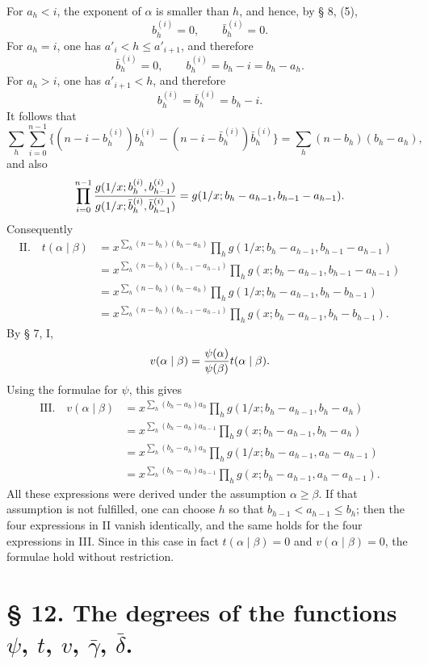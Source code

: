 \documentclass[11pt,a4paper]{article}
\begin{document}
For $a_h<i$, the exponent of $\alpha$ is smaller than $h$, and hence, by § 8, (5),
\[
 b_h^{(i)}=0,
 \qquad \bar b_h^{(i)}=0.
\]
For $a_h=i$, one has $a'_i<h\le a'_{i+1}$, and therefore
\[
 \bar b_h^{(i)}=0,
 \qquad b_h^{(i)}=b_h-i=b_h-a_h.
\]
For $a_h>i$, one has $a'_{i+1}<h$, and therefore
\[
 b_h^{(i)}=\bar b_h^{(i)}=b_h-i.
\]
It follows that
\begin{equation}
 \sum_h\sum_{i=0}^{n-1}\{(n-i-b_h^{(i)})b_h^{(i)}-(n-i-\bar b_h^{(i)})\bar b_h^{(i)}\}
 =\sum_h(n-b_h)(b_h-a_h),
\tag{4}
\end{equation}
and also
\[
\prod_{i=0}^{n-1}
 {g(1/x;b_h^{(i)},b_{h-1}^{(i)})\over
 g(1/x;\bar b_h^{(i)},\bar b_{h-1}^{(i)})}
 =g(1/x;b_h-a_{h-1},b_{h-1}-a_{h-1}).
\]
Consequently
\begin{align*}
\text{II.}\quad
 t(\alpha\mid\beta)
 &=x^{\sum_h(n-b_h)(b_h-a_h)}
 \prod_h g(1/x;b_h-a_{h-1},b_{h-1}-a_{h-1})\\
 &=x^{\sum_h(n-b_h)(b_{h-1}-a_{h-1})}
 \prod_h g(x;b_h-a_{h-1},b_{h-1}-a_{h-1})\\
 &=x^{\sum_h(n-b_h)(b_h-a_h)}
 \prod_h g(1/x;b_h-a_{h-1},b_h-b_{h-1})\\
 &=x^{\sum_h(n-b_h)(b_{h-1}-a_{h-1})}
 \prod_h g(x;b_h-a_{h-1},b_h-b_{h-1}).
\end{align*}
By § 7, I,
\[
 v(\alpha\mid\beta)={\psi(\alpha)\over\psi(\beta)}t(\alpha\mid\beta).
\]
Using the formulae for $\psi$, this gives
\begin{align*}
\text{III.}\quad
 v(\alpha\mid\beta)&=x^{\sum_h(b_h-a_h)a_h}
 \prod_h g(1/x;b_h-a_{h-1},b_h-a_h)\\
 &=x^{\sum_h(b_h-a_h)a_{h-1}}
 \prod_h g(x;b_h-a_{h-1},b_h-a_h)\\
 &=x^{\sum_h(b_h-a_h)a_h}
 \prod_h g(1/x;b_h-a_{h-1},a_h-a_{h-1})\\
 &=x^{\sum_h(b_h-a_h)a_{h-1}}
 \prod_h g(x;b_h-a_{h-1},a_h-a_{h-1}).
\end{align*}
All these expressions were derived under the assumption $\alpha\ge\beta$. If that assumption is not fulfilled, one can choose $h$ so that $b_{h-1}<a_{h-1}\le b_h$; then the four expressions in II vanish identically, and the same holds for the four expressions in III. Since in this case in fact $t(\alpha\mid\beta)=0$ and $v(\alpha\mid\beta)=0$, the formulae hold without restriction.

\section*{§ 12. The degrees of the functions $\psi$, $t$, $v$, $\bar\gamma$, $\bar\delta$.}
\end{document}
